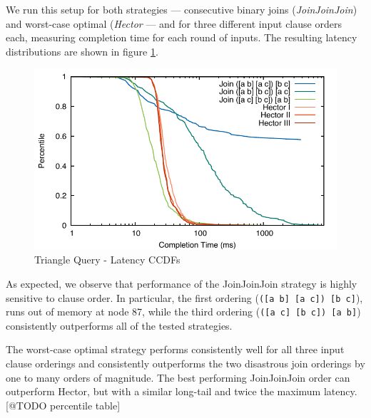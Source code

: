 \documentclass[../catalog.tex]{subfiles}
\begin{document}
We run this setup for both strategies — consecutive binary joins
(\emph{JoinJoinJoin}) and worst-case optimal (\emph{Hector} — and for
three different input clause orders each, measuring completion time
for each round of inputs. The resulting latency distributions are
shown in figure \ref{fig:triangle-cdfs}.

\begin{figure}[h!]
  \includegraphics[width=1.0\linewidth]{results/triangles/out/all_cdfs}
  \caption{Triangle Query - Latency CCDFs}
  \label{fig:triangle-cdfs}
\end{figure}

As expected, we observe that performance of the JoinJoinJoin strategy
is highly sensitive to clause order. In particular, the first ordering
(\texttt{([a b] [a c]) [b c]}), runs out of memory at node 87, while
the third ordering (\texttt{([a c] [b c]) [a b]}) consistently
outperforms all of the tested strategies.

The worst-case optimal strategy performs consistently well for all
three input clause orderings and consistently outperforms the two
disastrous join orderings by one to many orders of magnitude. The best
performing JoinJoinJoin order can outperform Hector, but with a
similar long-tail and twice the maximum latency. [@TODO percentile
  table]
\end{document}
